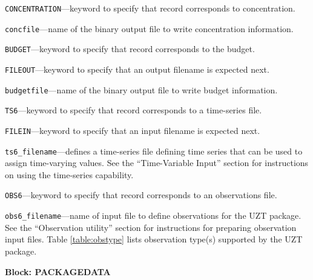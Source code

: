 \begin{description}
\item \texttt{CONCENTRATION}---keyword to specify that record corresponds to concentration.

\item \texttt{concfile}---name of the binary output file to write concentration information.

\item \texttt{BUDGET}---keyword to specify that record corresponds to the budget.

\item \texttt{FILEOUT}---keyword to specify that an output filename is expected next.

\item \texttt{budgetfile}---name of the binary output file to write budget information.

\item \texttt{TS6}---keyword to specify that record corresponds to a time-series file.

\item \texttt{FILEIN}---keyword to specify that an input filename is expected next.

\item \texttt{ts6\_filename}---defines a time-series file defining time series that can be used to assign time-varying values. See the ``Time-Variable Input'' section for instructions on using the time-series capability.

\item \texttt{OBS6}---keyword to specify that record corresponds to an observations file.

\item \texttt{obs6\_filename}---name of input file to define observations for the UZT package. See the ``Observation utility'' section for instructions for preparing observation input files. Table \ref{table:obstype} lists observation type(s) supported by the UZT package.

\end{description}
\item \textbf{Block: PACKAGEDATA}


